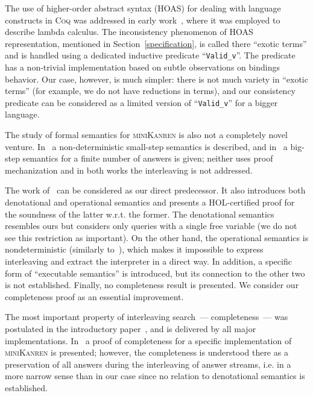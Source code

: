The use of higher-order abstract syntax (HOAS) for dealing with language constructs in \textsc{Coq} was addressed in early work~\cite{HOASinCoq},
where it was employed to describe lambda calculus. The inconsistency phenomenon of HOAS representation, mentioned in Section~\ref{specification}, is called
there ``exotic terms'' and is handled using a dedicated inductive predicate ``\lstinline|Valid_v|''. The predicate has a non-trivial implementation based
on subtle observations on bindings behavior. Our case, however, is much simpler: there is not much variety in ``exotic terms'' (for example, we do not have
reductions in terms), and our consistency predicate can be considered as a limited version of ``\lstinline|Valid_v|'' for a bigger language.

The study of formal semantics for \textsc{miniKanren} is also not a completely novel venture. In~\cite{RelConversion} a non-deterministic
small-step semantics is described, and in~\cite{DivTest} a big-step semantics for a finite number of answers is given;
neither uses proof mechanization and in both works the interleaving is not addressed. 

The work of~\cite{MechanisingMiniKanren} can be considered as our direct predecessor. It also introduces both denotational and
operational semantics and presents a \textsc{HOL}-certified proof for the soundness of the latter w.r.t. the former. The denotational
semantics resembles ours but considers only queries with a single free variable (we do not see this restriction as important).
On the other hand, the operational semantics is nondeterministic (similarly to~\cite{RelConversion}), which makes it
impossible to express interleaving and extract the interpreter in a direct way. In addition, a specific form of ``executable semantics''
is introduced, but its connection to the other two is not established. Finally, no completeness result is presented.
We consider our completeness proof as an essential improvement. 

The most important property of interleaving search~--- completeness~--- was postulated in the introductory paper~\cite{Search}, and is delivered by
all major implementations. In~\cite{2016} a proof of completeness for a specific implementation of \textsc{miniKanren} is presented; however, the completeness is understood there as a
preservation of all answers during the interleaving of answer streams, i.e. in a more narrow sense than in our case since no relation
to denotational semantics is established.
